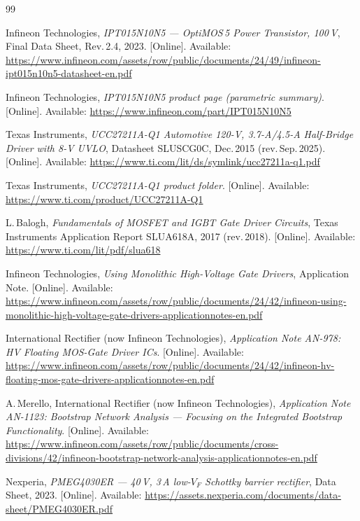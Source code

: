 \documentclass[journal,onecolumn,11pt]{IEEEtran}
\begin{document}
\begin{thebibliography}{99}
\setlength{\itemsep}{2pt}

 Infineon Technologies, \emph{IPT015N10N5 --- OptiMOS\texttrademark\,5 Power Transistor, 100\,V}, Final Data Sheet, Rev.\,2.4, 2023. [Online]. Available: \url{https://www.infineon.com/assets/row/public/documents/24/49/infineon-ipt015n10n5-datasheet-en.pdf}

 Infineon Technologies, \emph{IPT015N10N5 product page (parametric summary)}. [Online]. Available: \url{https://www.infineon.com/part/IPT015N10N5}

 Texas Instruments, \emph{UCC27211A-Q1 Automotive 120-V, 3.7-A/4.5-A Half-Bridge Driver with 8-V UVLO}, Datasheet SLUSCG0C, Dec.\,2015 (rev.\,Sep.\,2025). [Online]. Available: \url{https://www.ti.com/lit/ds/symlink/ucc27211a-q1.pdf}

 Texas Instruments, \emph{UCC27211A-Q1 product folder}. [Online]. Available: \url{https://www.ti.com/product/UCC27211A-Q1}

 L.\,Balogh, \emph{Fundamentals of MOSFET and IGBT Gate Driver Circuits}, Texas Instruments Application Report SLUA618A, 2017 (rev.\,2018). [Online]. Available: \url{https://www.ti.com/lit/pdf/slua618}

 Infineon Technologies, \emph{Using Monolithic High-Voltage Gate Drivers}, Application Note. [Online]. Available: \url{https://www.infineon.com/assets/row/public/documents/24/42/infineon-using-monolithic-high-voltage-gate-drivers-applicationnotes-en.pdf}

 International Rectifier (now Infineon Technologies), \emph{Application Note AN-978: HV Floating MOS-Gate Driver ICs}. [Online]. Available: \url{https://www.infineon.com/assets/row/public/documents/24/42/infineon-hv-floating-mos-gate-drivers-applicationnotes-en.pdf}

 A.\,Merello, International Rectifier (now Infineon Technologies), \emph{Application Note AN-1123: Bootstrap Network Analysis --- Focusing on the Integrated Bootstrap Functionality}. [Online]. Available: \url{https://www.infineon.com/assets/row/public/documents/cross-divisions/42/infineon-bootstrap-network-analysis-applicationnotes-en.pdf}

 Nexperia, \emph{PMEG4030ER --- 40\,V, 3\,A low-$V_F$ Schottky barrier rectifier}, Data Sheet, 2023. [Online]. Available: \url{https://assets.nexperia.com/documents/data-sheet/PMEG4030ER.pdf}


\end{thebibliography}
\end{document}
